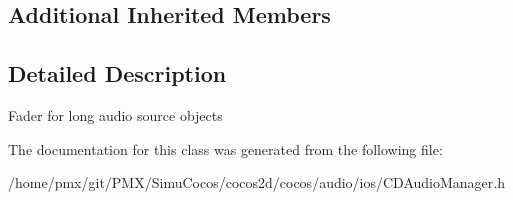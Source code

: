 \subsection*{Additional Inherited Members}


\subsection{Detailed Description}
Fader for long audio source objects 

The documentation for this class was generated from the following file\+:\begin{DoxyCompactItemize}
\item 
/home/pmx/git/\+P\+M\+X/\+Simu\+Cocos/cocos2d/cocos/audio/ios/C\+D\+Audio\+Manager.\+h\end{DoxyCompactItemize}
